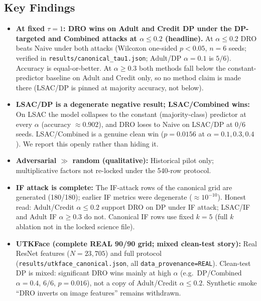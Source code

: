 \documentclass[11pt,a4paper]{article}
\begin{document}
\begin{table}[H]
\centering\small
\caption{Fairness-targeted PGD attacks: DRO vs Naive (mean over 6 seeds, $\tau{=}1$ canonical).}
\label{tab:fairness-attacks}

\end{table}

\subsection{Key Findings}

\begin{itemize}
\item \textbf{At fixed $\tau{=}1$: DRO wins on Adult and Credit DP under the DP-targeted and Combined attacks at $\alpha\le0.2$ (headline).}
  At $\alpha\le0.2$ DRO beats Naive under both attacks (Wilcoxon
  one-sided $p{<}0.05$, $n{=}6$ seeds; verified in
  \texttt{results/canonical\_tau1.json}; Adult/DP $\alpha{=}0.1$ is $5/6$).
  Accuracy is equal-or-better.
  At $\alpha\ge0.3$ both methods fall below the constant-predictor
  baseline on Adult and Credit only, so no method claim is made there
  (LSAC/DP is pinned at majority accuracy, not below).
\item \textbf{LSAC/DP is a degenerate negative result; LSAC/Combined wins:}
  On LSAC the model collapses to the constant (majority-class) predictor at
  every $\alpha$ (accuracy $\approx0.902$), and DRO loses to Naive on
  LSAC/DP at $0/6$ seeds.  LSAC/Combined is a genuine clean win
  ($p{=}0.0156$ at $\alpha{=}0.1,0.3,0.4$).  We report this openly rather
  than hiding it.
\item \textbf{Adversarial $\gg$ random (qualitative):} Historical pilot only;
  multiplicative factors not re-locked under the 540-row protocol.
\item \textbf{IF attack is complete:} The IF-attack rows of the canonical grid
  are generated (180/180); earlier IF metrics were degenerate ($\approx10^{-10}$).
  Honest read: Adult/Credit $\alpha\le0.2$ support DRO on DP under IF attack;
  LSAC/IF and Adult IF $\alpha\ge0.3$ do not.  Canonical IF rows use fixed
  $k{=}5$ (full $k$ ablation not in the locked science file).
\item \textbf{UTKFace (complete REAL 90/90 grid; mixed clean-test story):}
  Real ResNet features ($N{=}23{,}705$) and full protocol
  (\texttt{results/utkface\_canonical.json}, all
  \texttt{data\_provenance{=}REAL}).  Clean-test DP is mixed: significant
  DRO wins mainly at high $\alpha$ (e.g.\ DP/Combined $\alpha{=}0.4$, $6/6$,
  $p{=}0.016$), not a copy of Adult/Credit $\alpha\le0.2$.  Synthetic smoke
  ``DRO inverts on image features'' remains withdrawn.
\end{itemize}
\end{document}
